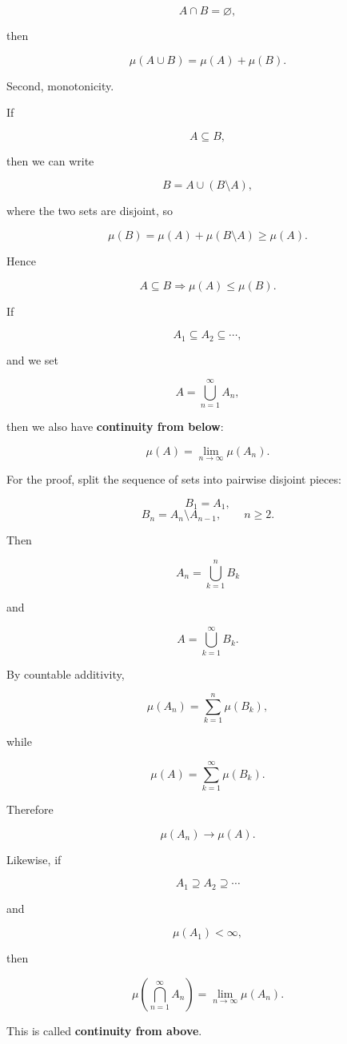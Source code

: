 \documentclass[11pt]{article}
\begin{document}
\[
A\cap B=\varnothing,
\]

then

\[
\mu(A\cup B)=\mu(A)+\mu(B).
\]

Second, monotonicity.

If

\[
A\subseteq B,
\]

then we can write

\[
B=A\cup(B\setminus A),
\]

where the two sets are disjoint, so

\[
\mu(B)=\mu(A)+\mu(B\setminus A)\geq\mu(A).
\]

Hence

\[
A\subseteq B\Longrightarrow\mu(A)\leq\mu(B).
\]

If

\[
A_{1}\subseteq A_{2}\subseteq\cdots,
\]

and we set

\[
A=\bigcup_{n=1}^{\infty}A_{n},
\]

then we also have \textbf{continuity from below}:

\[
\mu(A)=\lim_{n\to\infty}\mu(A_{n}).
\]

For the proof, split the sequence of sets into pairwise disjoint pieces:

\[
B_{1}=A_{1},
\]
\[
B_{n}=A_{n}\setminus A_{n-1},\qquad n\geq2.
\]

Then

\[
A_{n}=\bigcup_{k=1}^{n}B_{k}
\]

and

\[
A=\bigcup_{k=1}^{\infty}B_{k}.
\]

By countable additivity,

\[
\mu(A_{n})=\sum_{k=1}^{n}\mu(B_{k}),
\]

while

\[
\mu(A)=\sum_{k=1}^{\infty}\mu(B_{k}).
\]

Therefore

\[
\mu(A_{n})\rightarrow\mu(A).
\]

Likewise, if

\[
A_{1}\supseteq A_{2}\supseteq\cdots
\]

and

\[
\mu(A_{1})<\infty,
\]

then

\[
\mu\left(\bigcap_{n=1}^{\infty}A_{n}\right)=\lim_{n\to\infty}\mu(A_{n}).
\]

This is called \textbf{continuity from above}.
\end{document}
